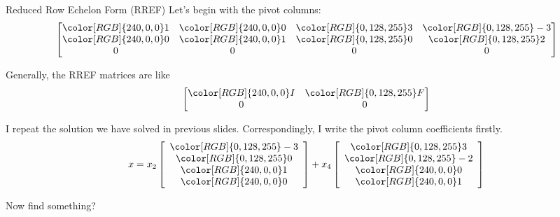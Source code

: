 \documentclass{beamer}
\begin{document}
\begin{frame}{Reduced Row Echelon Form (RREF)}
Let's begin with the pivot columns:
\begin{equation*}
    \left[ \begin{matrix}
        {\color[RGB]{240, 0, 0} 1}&		{\color[RGB]{240, 0, 0} 0}&		{\color[RGB]{0, 128, 255} 3}&		{\color[RGB]{0, 128, 255} -3}\\
        {\color[RGB]{240, 0, 0} 0}&		{\color[RGB]{240, 0, 0} 1}&		{\color[RGB]{0, 128, 255} 0}&		{\color[RGB]{0, 128, 255} 2}\\
        0&		0&		0&		0\\
    \end{matrix} \right]
\end{equation*}

Generally, the RREF matrices are like
\begin{equation*}
    \left[ \begin{matrix}
        {\color[RGB]{240, 0, 0} I}&		{\color[RGB]{0, 128, 255} F}\\
        0&		0\\
    \end{matrix} \right]
\end{equation*}

I repeat the solution we have solved in previous slides. Correspondingly, I write the pivot column coefficients firstly.
\begin{equation*}
    x=x_2\left[ \begin{array}{c}
        \color[RGB]{0, 128, 255} -3\\
        \color[RGB]{0, 128, 255} 0\\
        {\color[RGB]{240, 0, 0} 1}\\
        {\color[RGB]{240, 0, 0} 0}\\
    \end{array} \right] +x_4\left[ \begin{array}{c}
        \color[RGB]{0, 128, 255} 3\\
        \color[RGB]{0, 128, 255} -2\\
        {\color[RGB]{240, 0, 0} 0}\\
        {\color[RGB]{240, 0, 0} 1}\\
    \end{array} \right]
\end{equation*}

Now find something?

\end{frame}
\end{document}
